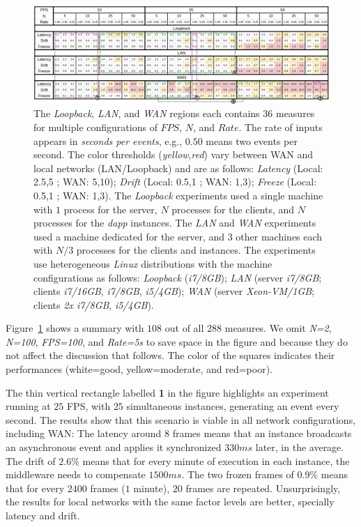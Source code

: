 \documentclass[sigplan,screen]{acmart}
\newcommand{\dapp}{\emph{dapp}\xspace}
\begin{document}
\begin{figure}[t]
  \centering
  \includegraphics[width=\linewidth]{table2}
  \caption{
    \label{fig.table}
The \emph{Loopback}, \emph{LAN}, and \emph{WAN} regions each contains $36$
measures for multiple configurations of $FPS$, $N$, and $Rate$.
The rate of inputs appears in \emph{seconds per events}, e.g., $0.50$ means two
events per second.
%
The color thresholds (\emph{yellow},\emph{red}) vary between WAN and local
networks (LAN/Loopback) and are as follows:
    \emph{Latency} (Local: 2.5,5 ; WAN: 5,10);
    \emph{Drift}   (Local: 0.5,1 ; WAN: 1,3);
    \emph{Freeze}  (Local: 0.5,1 ; WAN: 1,3).
%
The \emph{Loopback} experiments used a single machine with $1$ process for the
server, $N$ processes for the clients, and $N$ processes for the \dapp
instances.
The \emph{LAN} and \emph{WAN} experiments used a machine dedicated for the
server, and $3$ other machines each with $N/3$ processes for the clients and
instances.
%
The experiments use heterogeneous \emph{Linux} distributions with the machine
configurations as follows:
    \emph{Loopback} (\emph{i7/8GB});
    \emph{LAN} (server \emph{i7/8GB}; clients \emph{i7/16GB}, \emph{i7/8GB}, \emph{i5/4GB});
    \emph{WAN} (server \emph{Xeon-VM/1GB}; clients \emph{2x i7/8GB}, \emph{i5/4GB}).
  }
\end{figure}

Figure~\ref{fig.table} shows a summary with $108$ out of all $288$ measures.
We omit \emph{N=2}, \emph{N=100}, \emph{FPS=100}, and \emph{Rate=5s} to save
space in the figure and because they do not affect the discussion that follows.
The color of the squares indicates their performances
    (white=good, yellow=moderate, and red=poor).

The thin vertical rectangle labelled \textbf{1} in the figure highlights an
experiment running at $25$ FPS, with $25$ simultaneous instances, generating an
event every second.
%
The results show that this scenario is viable in all network configurations,
including WAN:
%
The latency around $8$ frames means that an instance broadcasts an asynchronous
event and applies it synchronized $330ms$ later, in the average.
The drift of $2.6\%$ means that for every minute of execution in each instance,
the middleware needs to compensate $1500ms$.
The two frozen frames of $0.9\%$ means that for every $2400$ frames
($1$ minute), $20$ frames are repeated.
%
Unsurprisingly, the results for local networks with the same factor levels are
better, specially latency and drift.
\end{document}
